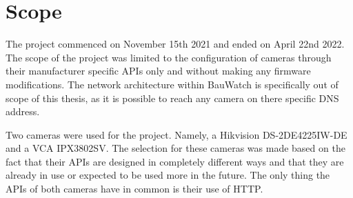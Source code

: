 \section{Scope}


The project commenced on November 15th 2021 and ended on April 22nd 2022. The scope of the project was limited to the configuration of cameras through their manufacturer specific APIs only and without making any firmware modifications.
The network architecture within BauWatch is specifically out of scope of this thesis, as it is possible to reach any camera on there specific DNS address.


Two cameras were used for the project. Namely, a Hikvision DS-2DE4225IW-DE and a VCA IPX3802SV.
The selection for these cameras was made based on the fact that their APIs are designed in completely different ways and that they are already in use or expected to be used more in the future.
The only thing the APIs of both cameras have in common is their use of HTTP.
